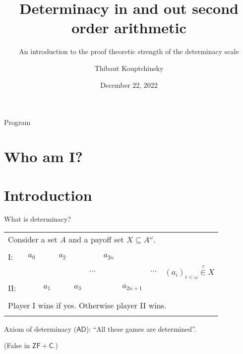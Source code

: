\documentclass{beamer} %
\title[]{Determinacy in and out second order arithmetic}
\subtitle[]{An introduction to the proof theoretic strength of the determinacy scale}
\institute[Proof Theory Conference]{}
\author{Thibaut Kouptchinsky}
\date{December 22, 2022}
\begin{document}
\begin{frame}
	\titlepage
\end{frame}


\begin{frame}{Program}
    \tableofcontents
\end{frame}


\section{Who am I?}

\begin{frame}
    
\end{frame}


%
\section{Introduction}

\begin{frame}{What is determinacy?}
    
    \begin{tabular}{llllllllll}
        \multicolumn{10}{l}{Consider a set $A$ and a payoff set $X \subseteq A^{\omega}$.}\\
        &&&&&&&&&\\
        I:\ & $a_0$ &       & $a_2$ &       &          &$a_{2n}$   &           & & \\
            &       &       &       &       & $\cdots$ &           &           & $\cdots$ & \qquad ${(a_i)}_{i < \omega} \overset{?}{\in} X$\\
        II:\ &       & $a_1$ &       & $a_3$ &          &           &$a_{2n+1}$ & & \\
        &&&&&&&&&\\
        \multicolumn{10}{l}{Player I wins if yes. Otherwise player II wins.} \\ 
        &&&&&&&&&\\
    \end{tabular}

    Axiom of determinacy ($\mathsf{AD}$): ``All these games are determined''.
    
    (False in $\mathsf{ZF + C}$.)
\end{frame}
\end{document}

